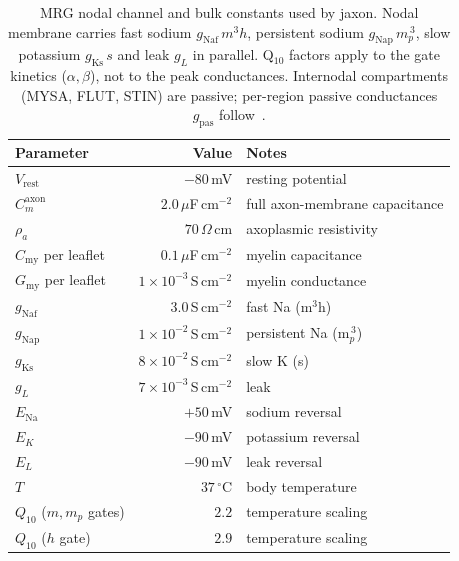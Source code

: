 \begin{table}[h]
  \centering
  \caption{MRG nodal channel and bulk constants used by jaxon.  Nodal
    membrane carries fast sodium $g_{\mathrm{Naf}}\,m^{3}h$,
    persistent sodium $g_{\mathrm{Nap}}\,m_p^{\,3}$, slow potassium
    $g_{\mathrm{Ks}}\,s$ and leak $g_L$ in parallel.  Q$_{10}$
    factors apply to the gate kinetics ($\alpha,\beta$), not to the
    peak conductances.  Internodal compartments (MYSA, FLUT, STIN)
    are passive; per-region passive conductances $g_{\mathrm{pas}}$
    follow~\cite{mcintyre2002}.}
  \label{tab:app-mrg}
  \small
  \begin{tabular}{l r p{4.7cm}}
    \toprule
    Parameter & Value & Notes \\
    \midrule
    $V_{\mathrm{rest}}$       & $-80$\,mV   & resting potential \\
    $C_m^{\mathrm{axon}}$     & $2.0\,\mu$F\,cm$^{-2}$ & full axon-membrane capacitance \\
    $\rho_a$                  & $70\,\Omega$\,cm        & axoplasmic resistivity \\
    $C_{\mathrm{my}}$ per leaflet & $0.1\,\mu$F\,cm$^{-2}$ & myelin capacitance \\
    $G_{\mathrm{my}}$ per leaflet & $1\times 10^{-3}$\,S\,cm$^{-2}$ & myelin conductance \\
    $g_{\mathrm{Naf}}$        & $3.0$\,S\,cm$^{-2}$       & fast Na (m$^3$h) \\
    $g_{\mathrm{Nap}}$        & $1\times 10^{-2}$\,S\,cm$^{-2}$ & persistent Na (m$_p^{\,3}$) \\
    $g_{\mathrm{Ks}}$         & $8\times 10^{-2}$\,S\,cm$^{-2}$ & slow K (s) \\
    $g_L$                     & $7\times 10^{-3}$\,S\,cm$^{-2}$ & leak \\
    $E_{\mathrm{Na}}$         & $+50$\,mV   & sodium reversal \\
    $E_K$                     & $-90$\,mV   & potassium reversal \\
    $E_L$                     & $-90$\,mV   & leak reversal \\
    $T$                       & $37\,^\circ$C & body temperature \\
    $Q_{10}$ ($m,m_p$ gates)  & $2.2$        & temperature scaling \\
    $Q_{10}$ ($h$ gate)       & $2.9$        & temperature scaling \\

\end{tabular}
\end{table}
